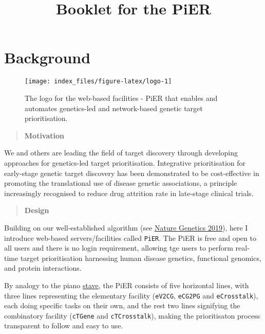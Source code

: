 \documentclass[
  oneside]{book}
\title{Booklet for the PiER}
\author{}
\date{\vspace{-2.5em}}
\begin{document}
\maketitle

{
\setcounter{tocdepth}{2}
\tableofcontents
}
\hypertarget{index}{%
\chapter{Background}\label{index}}

\begin{figure}

{\centering \texttt{[image: index\_files/figure-latex/logo-1]} 

}

\caption{The logo for the web-based facilities - PiER that enables and automates genetics-led and network-based genetic target prioritisation.}\label{fig:logo}
\end{figure}

\begin{quote}
\textbf{Motivation}
\end{quote}

We and others are leading the field of target discovery through developing approaches for genetics-led target prioritisation. Integrative prioritisation for early-stage genetic target discovery has been demonstrated to be cost-effective in promoting the translational use of disease genetic associations, a principle increasingly recognised to reduce drug attrition rate in late-stage clinical trials.

\begin{quote}
\textbf{Design}
\end{quote}

Building on our well-established algorithm (see \href{https://www.ncbi.nlm.nih.gov/pubmed/31253980}{Nature Genetics 2019}), here I introduce web-based servers/facilities called \texttt{PiER}. The PiER is free and open to all users and there is no login requirement, allowing tge users to perform real-time target prioritisation harnessing human disease genetics, functional genomics, and protein interactions.

By analogy to the piano \href{https://www.piano-keyboard-guide.com/grand-staff.html}{stave}, the PiER consists of five horizontal lines, with three lines representing the elementary facility (\texttt{eV2CG}, \texttt{eCG2PG} and \texttt{eCrosstalk}), each doing specific tasks on their own, and the rest two lines signifying the combinatory facility (\texttt{cTGene} and \texttt{cTCrosstalk}), making the prioritisaton process transparent to follow and easy to use.
\end{document}

